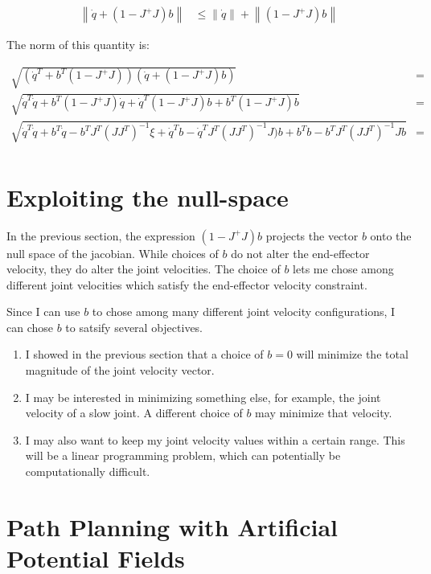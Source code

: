 \documentclass{article}
\begin{document}
\begin{align}
	\left\lVert \dot{q} + (1 - J^+ J) b \right\rVert 
		& \leq \left\lVert \dot{q} \right\rVert
		+ \left\lVert (1 - J^+ J) b \right\rVert
\end{align}

The norm of this quantity is:

\begin{align}
	\sqrt{ \left( \dot{q}^T + b^T (1 - J^+ J) \right) 
		\left( \dot{q} + (1 - J^+ J) b \right) } & = \nonumber \\
	\sqrt{ \dot{q}^T \dot{q}
		+ b^T (1 - J^+ J) \dot{q} 
		+ \dot{q}^T (1 - J^+ J) b
		+ b^T (1 - J^+ J) b} & = \nonumber \\
	\sqrt{ \dot{q}^T \dot{q}
		+ b^T \dot{q}
		- b^T J^T (JJ^T)^{-1} \xi
		+ \dot{q}^T b
		- \dot{q}^T J^T (JJ^T)^{-1} J) b
		+ b^T b
		- b^T J^T (JJ^T)^{-1} J b} & = \nonumber \\
\end{align}

\section{Exploiting the null-space}

In the previous section, the expression $(1 - J^+ J) b$ projects the vector $b$ 
	onto the null space of the jacobian.
While choices of $b$ do not alter the end-effector velocity, they do alter the joint
	velocities.
The choice of $b$ lets me chose among different joint velocities which satisfy
	the end-effector velocity constraint.

Since I can use $b$ to chose among many different joint velocity configurations,
	I can chose $b$ to satsify several objectives.

\begin{enumerate}
\item
I showed in the previous section that a choice of $b = 0$ will minimize the total magnitude
	of the joint velocity vector.
\item
I may be interested in minimizing something else, for example, the joint velocity
	of a slow joint.
A different choice of $b$ may minimize that velocity.
\item
I may also want to keep my joint velocity values within a certain range.
This will be a linear programming problem, which can potentially be computationally
	difficult.
\end{enumerate}

\section{Path Planning with Artificial Potential Fields}
\end{document}
